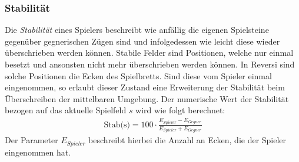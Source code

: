\documentclass[12pt,a4paper,bibliography=totocnumbered,listof=totocnumbered]{article}
\begin{document}
\subsubsection{Stabilität}
Die \emph{Stabilität} eines Spielers beschreibt wie anfällig die eigenen Spielsteine gegenüber gegnerischen Zügen sind und infolgedessen wie leicht diese wieder überschrieben werden können. Stabile Felder sind Positionen, welche nur einmal besetzt und ansonsten nicht mehr überschrieben werden können. In Reversi sind solche Positionen die Ecken des Spielbretts. Sind diese vom Spieler einmal eingenommen, so erlaubt dieser Zustand eine Erweiterung der Stabilität beim Überschreiben der mittelbaren Umgebung. Der numerische Wert der Stabilität bezogen auf das aktuelle Spielfeld $s$ wird wie folgt berechnet:
\begin{align}
	\text{Stab(s)} = 100 \cdot \frac{E_{Spieler} - E_{Gegner}}{E_{Spieler} + E_{Gegner}}
	\label{eqn:heur-stab}
\end{align}
Der Parameter $E_{Spieler}$ beschreibt hierbei die Anzahl an Ecken, die der Spieler eingenommen hat.  
\end{document}
